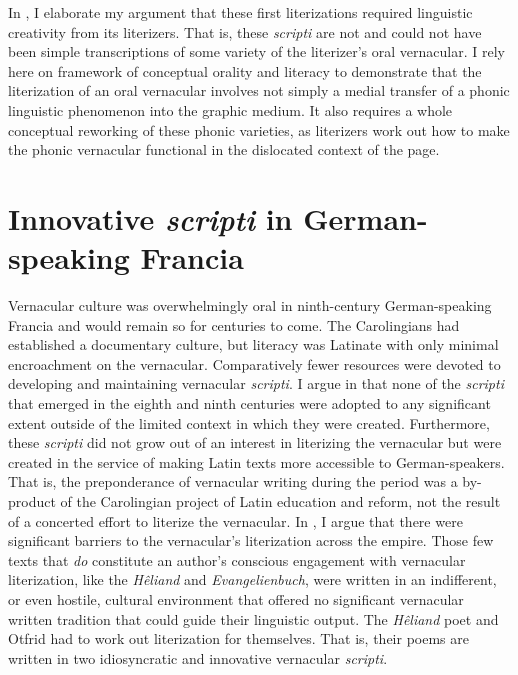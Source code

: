 In , I elaborate my argument that these first literizations required linguistic creativity from its literizers. That is, these \textit{scripti} are not and could not have been simple transcriptions of some variety of the literizer’s oral vernacular. I rely here on  framework of conceptual orality and literacy to demonstrate that the literization of an oral vernacular involves not simply a medial transfer of a phonic linguistic phenomenon into the graphic medium. It also requires a whole conceptual reworking of these phonic varieties, as literizers work out how to make the phonic vernacular functional in the dislocated context of the page.

\section{Innovative \textit{scripti} in German-speaking Francia}\label{sec:3:3.1}

Vernacular culture was overwhelmingly oral in ninth-century German-speaking Francia and would remain so for centuries to come. The Carolingians had established a documentary culture, but literacy was Latinate with only minimal encroachment on the vernacular. Comparatively fewer resources were devoted to developing and maintaining vernacular \textit{scripti}. I argue in  that none of the \textit{scripti} that emerged in the eighth and ninth centuries were adopted to any significant extent outside of the limited context in which they were created. Furthermore, these \textit{scripti} did not grow out of an interest in literizing the vernacular but were created in the service of making Latin texts more accessible to German-speakers. That is, the preponderance of vernacular writing during the period was a by-product of the Carolingian project of Latin education and reform, not the result of a concerted effort to literize the vernacular. In , I argue that there were significant barriers to the vernacular’s literization across the empire. Those few texts that \textit{do} constitute an author’s conscious engagement with vernacular literization, like the \textit{Hêliand} and \textit{Evangelienbuch}, were written in an indifferent, or even hostile, cultural environment that offered no significant vernacular written tradition that could guide their linguistic output. The \textit{Hêliand} poet and Otfrid had to work out literization for themselves. That is, their poems are written in two idiosyncratic and innovative vernacular \textit{scripti}.

